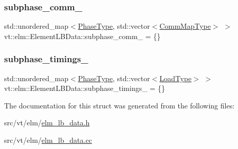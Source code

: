 \subsubsection{\texorpdfstring{subphase\+\_\+comm\+\_\+}{subphase\_comm\_}}
{\footnotesize\ttfamily std\+::unordered\+\_\+map$<$\hyperlink{namespacevt_a46ce6733d5cdbd735d561b7b4029f6d7}{Phase\+Type}, std\+::vector$<$\hyperlink{namespacevt_1_1elm_a38487cb8896b9b4763efa9022fab560e}{Comm\+Map\+Type}$>$ $>$ vt\+::elm\+::\+Element\+L\+B\+Data\+::subphase\+\_\+comm\+\_\+ = \{\}\hspace{0.3cm}{\ttfamily [protected]}}

\mbox{\label{structvt_1_1elm_1_1_element_l_b_data_a4307d2e80d236ad36f8d161febcb239a}} 
\subsubsection{\texorpdfstring{subphase\+\_\+timings\+\_\+}{subphase\_timings\_}}
{\footnotesize\ttfamily std\+::unordered\+\_\+map$<$\hyperlink{namespacevt_a46ce6733d5cdbd735d561b7b4029f6d7}{Phase\+Type}, std\+::vector$<$\hyperlink{namespacevt_a8fb51741340b87d7aaee0bef60e9896b}{Load\+Type}$>$ $>$ vt\+::elm\+::\+Element\+L\+B\+Data\+::subphase\+\_\+timings\+\_\+ = \{\}\hspace{0.3cm}{\ttfamily [protected]}}



The documentation for this struct was generated from the following files\+:\begin{DoxyCompactItemize}
\item 
src/vt/elm/\hyperlink{elm__lb__data_8h}{elm\+\_\+lb\+\_\+data.\+h}\item 
src/vt/elm/\hyperlink{elm__lb__data_8cc}{elm\+\_\+lb\+\_\+data.\+cc}\end{DoxyCompactItemize}
